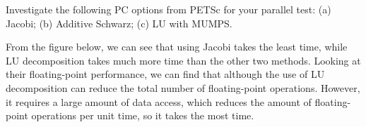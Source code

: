 \documentclass[a4paper]{article}
\begin{document}
        Investigate the following PC options from PETSc for your parallel test: (a) Jacobi; (b) Additive Schwarz; (c) LU with MUMPS.

        From the figure below, we can see that using Jacobi takes the least time, while LU decomposition takes much more time than the other two methods. Looking at their floating-point performance, we can find that although the use of LU decomposition can reduce the total number of floating-point operations. However, it requires a large amount of data access, which reduces the amount of floating-point operations per unit time, so it takes the most time.
        \begin{figure}[H]
            \centering  
            \label{Fig.flot}
        \end{figure}
        
       
\end{document}
